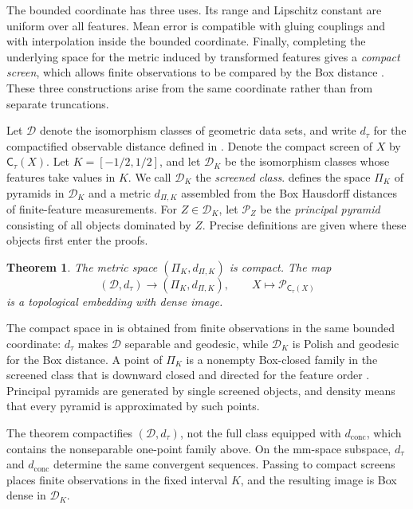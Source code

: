 \documentclass[11pt]{amsart}
\theoremstyle{plain}
\newtheorem{theorem}{Theorem}[section]
\theoremstyle{definition}
\theoremstyle{remark}
\newcommand{\D}{\mathcal D}
\newcommand{\DK}{\mathcal D_K}
\newcommand{\dconc}{d_{\mathrm{conc}}}
\newcommand{\dtau}{d_{\tau}}
\begin{document}
The bounded coordinate has three uses. Its range and Lipschitz constant are uniform over all features. Mean error is compatible with gluing couplings \cite[Definition~1.20]{shioya2016mmg} and with interpolation inside the bounded coordinate. Finally, completing the underlying space for the metric induced by transformed features gives a \emph{compact screen}, which allows finite observations to be compared by the Box distance \cite[Definition~5.7]{gds1}. These three constructions arise from the same coordinate rather than from separate truncations.

Let $\D$ denote the isomorphism classes of geometric data sets, and write $\dtau$ for the compactified observable distance defined in . Denote the compact screen of $X$ by $\mathsf C_\tau(X)$. Let $K=[-1/2,1/2]$, and let $\DK$ be the isomorphism classes whose features take values in $K$. We call $\DK$ the \emph{screened class}.  defines the space $\Pi_K$ of pyramids in $\DK$ and a metric $d_{\Pi,K}$ assembled from the Box Hausdorff distances of finite-feature measurements. For $Z\in\DK$, let $\mathcal P_Z$ be the \emph{principal pyramid} consisting of all objects dominated by $Z$. Precise definitions are given where these objects first enter the proofs.

\begin{theorem}
\label{thm:intro-compactification}
The metric space $(\Pi_K,d_{\Pi,K})$ is compact. The map
\[(\D,\dtau)\longrightarrow(\Pi_K,d_{\Pi,K}),\qquad X\longmapsto\mathcal P_{\mathsf C_\tau(X)}\]
is a topological embedding with dense image.
\end{theorem}

The compact space in  is obtained from finite observations in the same bounded coordinate: $\dtau$ makes $\D$ separable and geodesic, while $\DK$ is Polish and geodesic for the Box distance. A point of $\Pi_K$ is a nonempty Box-closed family in the screened class that is downward closed and directed for the feature order \cite[Definition~3.8]{gds1}. Principal pyramids are generated by single screened objects, and density means that every pyramid is approximated by such points.

The theorem compactifies $(\D,\dtau)$, not the full class equipped with $\dconc$, which contains the nonseparable one-point family above. On the mm-space subspace, $\dtau$ and $\dconc$ determine the same convergent sequences. Passing to compact screens places finite observations in the fixed interval $K$, and the resulting image is Box dense in $\DK$.
\end{document}
